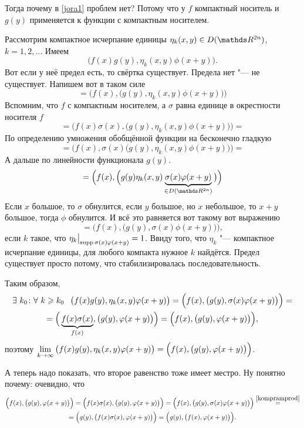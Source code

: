 Тогда почему в \eqref{jora1} проблем нет? Потому что у $f$ компактный носитель и $g(y)$ применяется к функции с компактным носителем.
\begin{Proof}
  Рассмотрим компактное исчерпание единицы $\eta_k(x,y)\in D(\R^{2n})$, $k=1,2,\dots$ Имеем
\[\big(f(x)g(y),\eta_k(x,y)\phi(x+y)\big).\]
Вот если у неё предел есть, то свёртка существует. Предела нет "--- не существует. Напишем вот в таком силе
\[ = \Big(f(x),\big(g(y),\eta_k(x,y)\phi(x+y)\big)\Big)\]
Вспомним, что $f$ с компактным носителем, а $\sigma$ равна единице в окрестности носителя $f$
\[ = \Big(f(x)\sigma(x),\big(g(y),\eta_k(x,y)\phi(x+y)\big)\Big) = \]
По определению умножения обобщённой функции на бесконечно гладкую
\[=\Big(f(x),\sigma(x)\big(g(y),\eta_k(x,y)\phi(x+y)\big)\Big) = \]
А дальше по линейности функционала $g(y)$.
\[=\Big(f(x),\Big(g(y)\eta_k(x,y)\underbrace{\sigma(x)\phi(x+y)}_{\in D(\R^{2n})}\big)\Big)\]
Если $x$ большое, то $\sigma$ обнулится, если $y$ большое, но $x$ небольшое, то $x+y$ большое, тогда $\phi$ обнулится. И всё это равняется вот такому вот выражению
\[ = \Big(f(x),\big(g(y),\sigma(x)\phi(x+y)\big)\Big),\]
если $k$ такое, что $\eta_k\big|_{\supp\sigma(x)\phi(x+y)} = 1$. Ввиду того, что $\eta_k$ "--- компактное исчерпание единицы, для любого компакта нужное $k$ найдётся. Предел существует просто потому, что стабилизировалась последовательность.

Таким образом,
\begin{multline*}
  \exists\ k_0\colon \forall\ k\ge k_0\pau \big(f(x)g(y),\eta_k(x,y)\phi(x+y)\big)=\Big(f(x),\big(g(y),\sigma(x)\phi(x+y)\big)\Big) = \\
  =\Big(\underbrace{f(x)\sigma(x)}_{f(x)},\big(g(y),\phi(x+y)\big)\Big) = \Big(f(x),\big(g(y),\phi(x+y)\big)\Big),
\end{multline*}
поэтому $\yo k\infty \big(f(x)g(y),\eta_k(x,y)\phi(x+y)\big) = \Big(f(x),\big(g(y),\phi(x+y)\big)\Big)$.

А теперь надо показать, что второе равенство тоже имеет местро. Ну понятно почему: очевидно, что 
\begin{multline*}
  \Big(f(x),\big(g(y),\phi(x+y)\big)\Big) = \Big(f(x)\sigma(x),\big(g(y),\phi(x+y)\big)\Big)=\Big(f(x),\big(g(y),\sigma(x)\phi(x+y)\big)\Big)\overset{\ref{kompramprod}}=\\
  =\Big(g(y),\big(f(x)\sigma(x),\phi(x+y)\big)\Big) = \Big(g(y),\big(f(x),\phi(x+y)\big)\Big).
\end{multline*}
\end{Proof}

